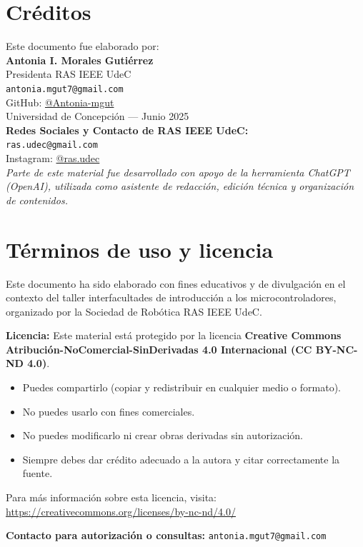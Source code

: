 \documentclass[a4paper,11pt]{article}
\begin{document}
\section*{Créditos}
Este documento fue elaborado por:\\[0.2cm]
\textbf{Antonia I. Morales Gutiérrez}\\
Presidenta RAS IEEE UdeC\\
\texttt{antonia.mgut7@gmail.com}\\
GitHub: \href{https://github.com/Antonia-mgut}{@Antonia-mgut}\\[0.4cm]
Universidad de Concepción — Junio 2025\\[0.5cm]
\textbf{Redes Sociales y Contacto de RAS IEEE UdeC:}\\
\texttt{ras.udec@gmail.com}\\
Instagram: \href{https://www.instagram.com/ras.udec}{@ras.udec}\\[0.5cm]


\textit{Parte de este material fue desarrollado con apoyo de la herramienta ChatGPT (OpenAI), utilizada como asistente de redacción, edición técnica y organización de contenidos.}

\section*{Términos de uso y licencia}
Este documento ha sido elaborado con fines educativos y de divulgación en el contexto del taller interfacultades de introducción a los microcontroladores, organizado por la Sociedad de Robótica RAS IEEE UdeC.

\bigskip

\textbf{Licencia:} Este material está protegido por la licencia \textbf{Creative Commons Atribución-NoComercial-SinDerivadas 4.0 Internacional (CC BY-NC-ND 4.0)}.

\begin{itemize}
  \item Puedes compartirlo (copiar y redistribuir en cualquier medio o formato).
  \item No puedes usarlo con fines comerciales.
  \item No puedes modificarlo ni crear obras derivadas sin autorización.
  \item Siempre debes dar crédito adecuado a la autora y citar correctamente la fuente.
\end{itemize}

Para más información sobre esta licencia, visita: \url{https://creativecommons.org/licenses/by-nc-nd/4.0/}

\bigskip

\textbf{Contacto para autorización o consultas:} \texttt{antonia.mgut7@gmail.com}
\end{document}
